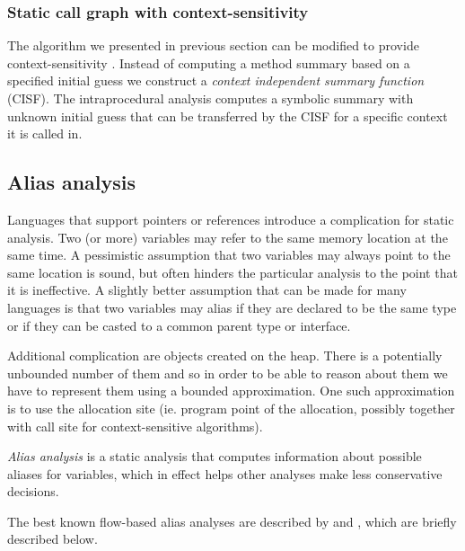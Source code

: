 \subsubsection{Static call graph with context-sensitivity}

The algorithm we presented in previous section can be modified to provide context-sensitivity \citep{Chatterjee1999,Cheng2000}. Instead of computing a method summary based on a specified initial guess we construct a \emph{context independent summary function} (CISF). The intraprocedural analysis computes a symbolic summary with unknown initial guess that can be transferred by the CISF for a specific context it is called in.

\subsection{Alias analysis}

Languages that support pointers or references introduce a complication for static analysis. Two (or more) variables may refer to the same memory location at the same time. A pessimistic assumption that two variables may always point to the same location is sound, but often hinders the particular analysis to the point that it is ineffective. A slightly better assumption that can be made for many languages is that two variables may alias if they are declared to be the same type or if they can be casted to a common parent type or interface.

Additional complication are objects created on the heap. There is a potentially unbounded number of them and so in order to be able to reason about them we have to represent them using a bounded approximation. One such approximation is to use the allocation site (ie. program point of the allocation, possibly together with call site for context-sensitive algorithms).

\emph{Alias analysis} is a static analysis that computes information about possible aliases for variables, which in effect helps other analyses make less conservative decisions.

The best known flow-based alias analyses are described by \citet{Andersen1994} and \citet{Steensgaard1996}, which are briefly described below.


